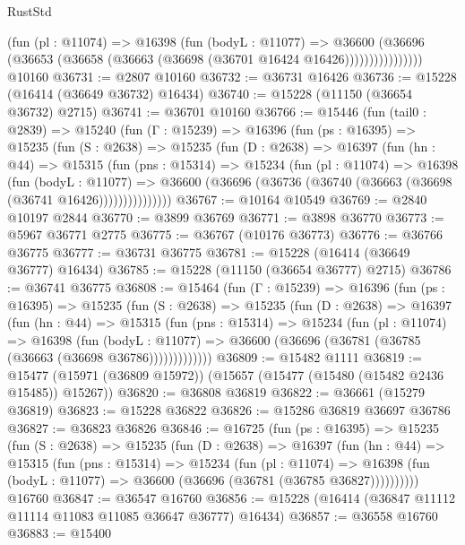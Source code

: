 \begin{lexlean}{RustStd}
\begin{coremodule}
                    (fun (pl : @11074) =>
                    @16398
                      (fun (bodyL : @11077) =>
                      @36600
                        (@36696
                          (@36653 (@36658 (@36663 (@36698 (@36701 @16424 @16426))))))))))))))))
    @10160
@36731 := @2807 @10160
@36732 := @36731 @16426
@36736 := @15228 (@16414 (@36649 @36732) @16434)
@36740 := @15228 (@11150 (@36654 @36732) @2715)
@36741 := @36701 @10160
@36766 := @15446
    (fun (tail0 : @2839) =>
    @15240
      (fun (Γ : @15239) =>
      @16396
        (fun (ps : @16395) =>
        @15235
          (fun (S : @2638) =>
          @15235
            (fun (D : @2638) =>
            @16397
              (fun (hn : @44) =>
              @15315
                (fun (pns : @15314) =>
                @15234
                  (fun (pl : @11074) =>
                  @16398
                    (fun (bodyL : @11077) =>
                    @36600 (@36696 (@36736 (@36740 (@36663 (@36698 (@36741 @16426)))))))))))))))
@36767 := @10164 @10549
@36769 := @2840 @10197 @2844
@36770 := @3899 @36769
@36771 := @3898 @36770
@36773 := @5967 @36771 @2775
@36775 := @36767 (@10176 @36773)
@36776 := @36766 @36775
@36777 := @36731 @36775
@36781 := @15228 (@16414 (@36649 @36777) @16434)
@36785 := @15228 (@11150 (@36654 @36777) @2715)
@36786 := @36741 @36775
@36808 := @15464
    (fun (Γ : @15239) =>
    @16396
      (fun (ps : @16395) =>
      @15235
        (fun (S : @2638) =>
        @15235
          (fun (D : @2638) =>
          @16397
            (fun (hn : @44) =>
            @15315
              (fun (pns : @15314) =>
              @15234
                (fun (pl : @11074) =>
                @16398
                  (fun (bodyL : @11077) =>
                  @36600 (@36696 (@36781 (@36785 (@36663 (@36698 @36786)))))))))))))
@36809 := @15482 @1111
@36819 := @15477 (@15971 (@36809 @15972)) (@15657 (@15477 (@15480 (@15482 @2436 @15485)) @15267))
@36820 := @36808 @36819
@36822 := @36661 (@15279 @36819)
@36823 := @15228 @36822
@36826 := @15286 @36819 @36697 @36786
@36827 := @36823 @36826
@36846 := @16725
    (fun (ps : @16395) =>
    @15235
      (fun (S : @2638) =>
      @15235
        (fun (D : @2638) =>
        @16397
          (fun (hn : @44) =>
          @15315
            (fun (pns : @15314) =>
            @15234
              (fun (pl : @11074) =>
              @16398 (fun (bodyL : @11077) => @36600 (@36696 (@36781 (@36785 @36827))))))))))
    @16760
@36847 := @36547 @16760
@36856 := @15228 (@16414 (@36847 @11112 @11114 @11083 @11085 @36647 @36777) @16434)
@36857 := @36558 @16760
@36883 := @15400

\end{coremodule}
\end{lexlean}
